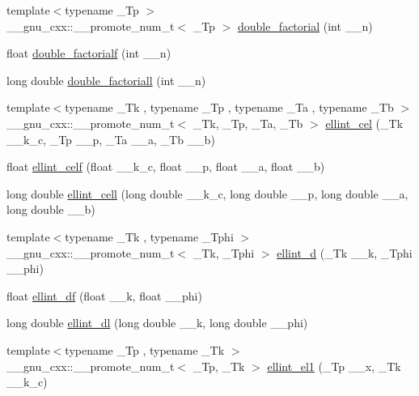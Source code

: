 \begin{DoxyCompactItemize}
\item 
{\footnotesize template$<$typename \+\_\+\+Tp $>$ }\\\+\_\+\+\_\+gnu\+\_\+cxx\+::\+\_\+\+\_\+promote\+\_\+num\+\_\+t$<$ \+\_\+\+Tp $>$ \hyperlink{namespace____gnu__cxx_a206cdf1ae7f9a0df3048af18892b8ba8}{double\+\_\+factorial} (int \+\_\+\+\_\+n)
\item 
float \hyperlink{namespace____gnu__cxx_a85ec284e603f32d18970bbdbb12d5150}{double\+\_\+factorialf} (int \+\_\+\+\_\+n)
\item 
long double \hyperlink{namespace____gnu__cxx_a0366730a4a775256217ef1cd9d0c3a04}{double\+\_\+factoriall} (int \+\_\+\+\_\+n)
\item 
{\footnotesize template$<$typename \+\_\+\+Tk , typename \+\_\+\+Tp , typename \+\_\+\+Ta , typename \+\_\+\+Tb $>$ }\\\+\_\+\+\_\+gnu\+\_\+cxx\+::\+\_\+\+\_\+promote\+\_\+num\+\_\+t$<$ \+\_\+\+Tk, \+\_\+\+Tp, \+\_\+\+Ta, \+\_\+\+Tb $>$ \hyperlink{namespace____gnu__cxx_ac1210d62b8e17df7c68cce463850a98f}{ellint\+\_\+cel} (\+\_\+\+Tk \+\_\+\+\_\+k\+\_\+c, \+\_\+\+Tp \+\_\+\+\_\+p, \+\_\+\+Ta \+\_\+\+\_\+a, \+\_\+\+Tb \+\_\+\+\_\+b)
\item 
float \hyperlink{namespace____gnu__cxx_a6d8fbef7853cf37de11278b1ff7127e8}{ellint\+\_\+celf} (float \+\_\+\+\_\+k\+\_\+c, float \+\_\+\+\_\+p, float \+\_\+\+\_\+a, float \+\_\+\+\_\+b)
\item 
long double \hyperlink{namespace____gnu__cxx_aa5add699fb2b4b02e63f8725a3a79750}{ellint\+\_\+cell} (long double \+\_\+\+\_\+k\+\_\+c, long double \+\_\+\+\_\+p, long double \+\_\+\+\_\+a, long double \+\_\+\+\_\+b)
\item 
{\footnotesize template$<$typename \+\_\+\+Tk , typename \+\_\+\+Tphi $>$ }\\\+\_\+\+\_\+gnu\+\_\+cxx\+::\+\_\+\+\_\+promote\+\_\+num\+\_\+t$<$ \+\_\+\+Tk, \+\_\+\+Tphi $>$ \hyperlink{namespace____gnu__cxx_a6a594ffefbe4f238f98fa2190b03795f}{ellint\+\_\+d} (\+\_\+\+Tk \+\_\+\+\_\+k, \+\_\+\+Tphi \+\_\+\+\_\+phi)
\item 
float \hyperlink{namespace____gnu__cxx_a02ed50be21fdd84ad6bed003f94a9e69}{ellint\+\_\+df} (float \+\_\+\+\_\+k, float \+\_\+\+\_\+phi)
\item 
long double \hyperlink{namespace____gnu__cxx_aa34bcb8e316f2e8b2b2bf48cd89abd98}{ellint\+\_\+dl} (long double \+\_\+\+\_\+k, long double \+\_\+\+\_\+phi)
\item 
{\footnotesize template$<$typename \+\_\+\+Tp , typename \+\_\+\+Tk $>$ }\\\+\_\+\+\_\+gnu\+\_\+cxx\+::\+\_\+\+\_\+promote\+\_\+num\+\_\+t$<$ \+\_\+\+Tp, \+\_\+\+Tk $>$ \hyperlink{namespace____gnu__cxx_af47c2f4fec36c1be5c5e2887269593f0}{ellint\+\_\+el1} (\+\_\+\+Tp \+\_\+\+\_\+x, \+\_\+\+Tk \+\_\+\+\_\+k\+\_\+c)

\end{DoxyCompactItemize}
